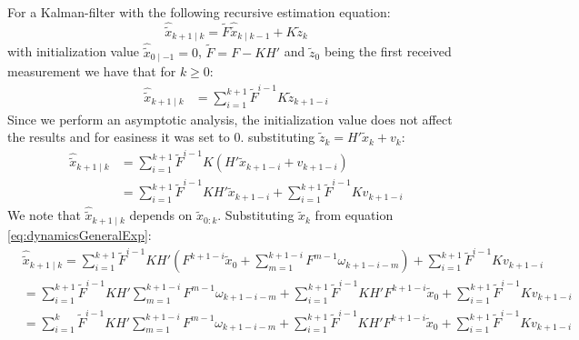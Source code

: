 \documentclass[oneside,12pt]{article}
\begin{document}
%
%
For a Kalman-filter with the following recursive estimation equation:
%
\begin{equation}\label{eq:basicUpdate}
    \hat{\tilde{x}}_{k+1 \mid k} = \tilde{F} \hat{\tilde{x}}_{k \mid k-1} + K \tilde{z}_k
\end{equation}
%
with initialization value $\hat{\tilde{x}}_{0 \mid -1} = 0$, $\tilde{F} = F - KH'$ and $\tilde{z}_0$ being the first received measurement we have that for $k \geq 0$:
%
\begin{equation}\label{eq:kalmanGeneralExp}
    \begin{split}
        \hat{\tilde{x}}_{k+1 \mid k} &=  \sum_{i=1}^{k+1} \tilde{F}^{i-1} K \tilde{z}_{k+1-i}
    \end{split}
\end{equation}
%
Since we perform an asymptotic analysis, the initialization value does not affect the results and for easiness it was set to 0. substituting $\tilde{z}_k = H' \tilde{x}_k + v_k$:
%
\begin{equation}\label{eq:kalmanOutput}
    \begin{split}
        \hat{\tilde{x}}_{k+1 \mid k} &= \sum_{i=1}^{k+1} \tilde{F}^{i-1} K (H' \tilde{x}_{k+1-i} + v_{k+1-i})\\
        &= \sum_{i=1}^{k+1} \tilde{F}^{i-1} K H' \tilde{x}_{k+1-i} + \sum_{i=1}^{k+1} \tilde{F}^{i-1} K v_{k+1-i}
    \end{split}
\end{equation}
%
We note that $\hat{\tilde{x}}_{k+1 \mid k}$ depends on $\tilde{x}_{0:k}$. Substituting $\tilde{x}_k$ from equation \ref{eq:dynamicsGeneralExp}:
%
\begin{equation}\label{eq:kalmanEstGeneralExp}
    \begin{split}
        &\hat{\tilde{x}}_{k+1 \mid k} = \sum_{i=1}^{k+1} \tilde{F}^{i-1} K H' (F^{k+1-i} \tilde{x}_0 + \sum_{m=1}^{k+1-i} F^{m-1} \omega_{k+1-i-m}) + \sum_{i=1}^{k+1} \tilde{F}^{i-1} K v_{k+1-i}\\
        &= \sum_{i=1}^{k+1} \tilde{F}^{i-1} K H' \sum_{m=1}^{k+1-i} F^{m-1} \omega_{k+1-i-m} + \sum_{i=1}^{k+1} \tilde{F}^{i-1} K H' F^{k+1-i} \tilde{x}_0 + \sum_{i=1}^{k+1} \tilde{F}^{i-1} K v_{k+1-i}\\
        &= \sum_{i=1}^{k} \tilde{F}^{i-1} K H' \sum_{m=1}^{k+1-i} F^{m-1} \omega_{k+1-i-m} + \sum_{i=1}^{k+1} \tilde{F}^{i-1} K H' F^{k+1-i} \tilde{x}_0 + \sum_{i=1}^{k+1} \tilde{F}^{i-1} K v_{k+1-i}\\
    \end{split}
\end{equation}
\end{document}
